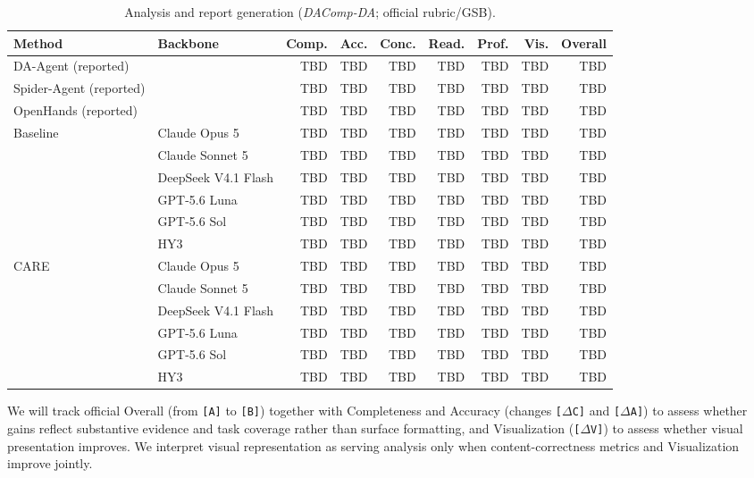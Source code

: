 \documentclass{article}
\newcommand{\method}{\textsc{CARE}}
\newcommand{\na}{\textemdash}
\begin{document}
\begin{table}[t]
  \caption{Analysis and report generation (\textit{DAComp-DA}; official rubric/GSB).}
  \label{tab:dacomp-matrix}
  \centering
  \scriptsize
  \setlength{\tabcolsep}{2.5pt}
  \begin{tabular}{llrrrrrrr}
    \toprule
    Method & Backbone & Comp. & Acc. & Conc. & Read. & Prof. & Vis. & Overall \\
    \midrule
    DA-Agent (reported) & \na & TBD & TBD & TBD & TBD & TBD & TBD & TBD \\
    Spider-Agent (reported) & \na & TBD & TBD & TBD & TBD & TBD & TBD & TBD \\
    OpenHands (reported) & \na & TBD & TBD & TBD & TBD & TBD & TBD & TBD \\
    \midrule
    \multirow{6}{*}{Baseline}
      & Claude Opus 5 & TBD & TBD & TBD & TBD & TBD & TBD & TBD \\
      & Claude Sonnet 5 & TBD & TBD & TBD & TBD & TBD & TBD & TBD \\
      & DeepSeek V4.1 Flash & TBD & TBD & TBD & TBD & TBD & TBD & TBD \\
      & GPT-5.6 Luna & TBD & TBD & TBD & TBD & TBD & TBD & TBD \\
      & GPT-5.6 Sol & TBD & TBD & TBD & TBD & TBD & TBD & TBD \\
      & HY3 & TBD & TBD & TBD & TBD & TBD & TBD & TBD \\
    \midrule
    \multirow{6}{*}{\method{}}
      & Claude Opus 5 & TBD & TBD & TBD & TBD & TBD & TBD & TBD \\
      & Claude Sonnet 5 & TBD & TBD & TBD & TBD & TBD & TBD & TBD \\
      & DeepSeek V4.1 Flash & TBD & TBD & TBD & TBD & TBD & TBD & TBD \\
      & GPT-5.6 Luna & TBD & TBD & TBD & TBD & TBD & TBD & TBD \\
      & GPT-5.6 Sol & TBD & TBD & TBD & TBD & TBD & TBD & TBD \\
      & HY3 & TBD & TBD & TBD & TBD & TBD & TBD & TBD \\
    \bottomrule
  \end{tabular}
\end{table}

We will track official Overall (from \texttt{[A]} to \texttt{[B]}) together with Completeness and Accuracy (changes \texttt{[$\Delta$C]} and \texttt{[$\Delta$A]}) to assess whether gains reflect substantive evidence and task coverage rather than surface formatting, and Visualization (\texttt{[$\Delta$V]}) to assess whether visual presentation improves.
We interpret visual representation as serving analysis only when content-correctness metrics and Visualization improve jointly.
\end{document}
